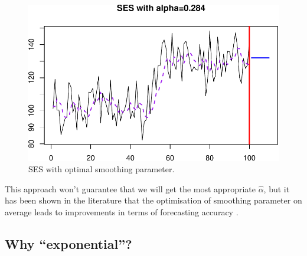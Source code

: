\documentclass[
]{book}
\newenvironment{Shaded}{\begin{snugshade}}{\end{snugshade}}
\newcommand{\AttributeTok}[1]{\textcolor[rgb]{0.77,0.63,0.00}{#1}}
\newcommand{\DecValTok}[1]{\textcolor[rgb]{0.00,0.00,0.81}{#1}}
\newcommand{\FunctionTok}[1]{\textcolor[rgb]{0.00,0.00,0.00}{#1}}
\newcommand{\NormalTok}[1]{#1}
\newcommand{\OtherTok}[1]{\textcolor[rgb]{0.56,0.35,0.01}{#1}}
\newcommand{\SpecialCharTok}[1]{\textcolor[rgb]{0.00,0.00,0.00}{#1}}
\newcommand{\StringTok}[1]{\textcolor[rgb]{0.31,0.60,0.02}{#1}}
\theoremstyle{definition}
\theoremstyle{definition}
\theoremstyle{definition}
\theoremstyle{definition}
\theoremstyle{remark}
\begin{document}
\begin{Shaded}
\end{Shaded}

\begin{figure}
\centering
\includegraphics{adam_files/figure-latex/SESExample3-1.pdf}
\caption{\label{fig:SESExample3}SES with optimal smoothing parameter.}
\end{figure}

This approach won't guarantee that we will get the most appropriate \(\hat{\alpha}\), but it has been shown in the literature that the optimisation of smoothing parameter on average leads to improvements in terms of forecasting accuracy \citep[see, for example,][]{Fildes1992}.

\hypertarget{whyExponential}{%
\subsection{Why ``exponential''?}\label{whyExponential}}
\end{document}

